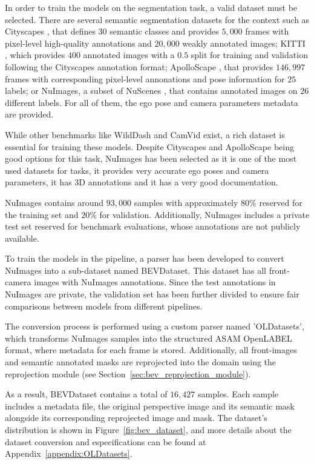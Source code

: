  \label{sec:BEVDataset}
In order to train the models on the segmentation task, a valid dataset must be selected. There are several semantic segmentation datasets for the  context such as Cityscapes \cite{Cityscapes}, that defines $30$ semantic classes and provides $5,000$ frames with pixel-level high-quality annotations and $20,000$ weakly annotated images; KITTI \cite{KITTI}, which provides $400$ annotated images with a $0.5$ split for training and validation following the Cityscapes annotation format; ApolloScape \cite{ApolloScape}, that provides $146,997$ frames with corresponding pixel-level annonations and pose information for $25$ labels; or NuImages, a subset of NuScenes \cite{nuscenes}, that contains annotated images on $26$ different labels. For all of them, the ego pose and camera parameters metadata are provided. 

While other benchmarks like WildDash \cite{WildDash} and CamVid \cite{CamVid} exist, a rich dataset is essential for training these models. Despite Cityscapes and ApolloScape being good options for this task, NuImages has been selected as it is one of the most used datasets for  tasks, it provides very accurate ego poses and camera parameters, it has 3D annotations and it has a very good documentation.

NuImages contains around $93,000$ samples with approximately $80\%$ reserved for the training set and $20\%$ for validation. Additionally, NuImages includes a private test set reserved for benchmark evaluations, whose annotations are not publicly available.

To train the models in the pipeline, a parser has been developed to convert NuImages into a sub-dataset named BEVDataset. This dataset has all front-camera images with NuImages annotations. Since the test annotations in NuImages are private, the validation set has been further divided to ensure fair comparisons between models from different pipelines.

The conversion process is performed using a custom parser named 'OLDatasets', which transforms NuImages samples into the structured ASAM OpenLABEL format, where metadata for each frame is stored. Additionally, all front-images and semantic annotated masks are reprojected into the  domain using the  reprojection module (see Section~\ref{sec:bev_reprojection_module}).

As a result, BEVDataset contains a total of $16,427$ samples. Each sample includes a metadata file, the original perspective image and its semantic mask alongside its corresponding  reprojected image and mask. The dataset's distribution is shown in Figure~\ref{fig:bev_dataset}, and more details about the dataset conversion and especifications can be found at Appendix~\ref{appendix:OLDatasets}.

